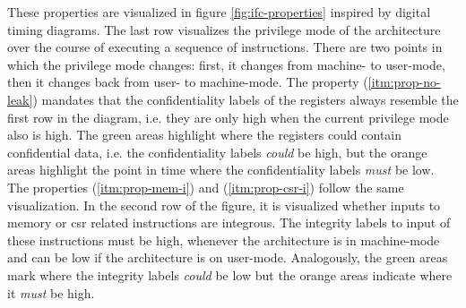These properties are visualized in figure \ref{fig:ifc-properties} inspired by digital timing diagrams.
The last row visualizes the privilege mode of the architecture over the course of executing a sequence of instructions.
There are two points in which the privilege mode changes: first, it changes from machine- to user-mode, then it changes back from user- to machine-mode.
The  property (\ref{itm:prop-no-leak}) mandates that the confidentiality labels of the registers always resemble the first row in the diagram, i.e. they are only high when the current privilege mode also is high.
The green areas highlight where the registers could contain confidential data, i.e. the confidentiality  labels \textit{could} be high, but the orange areas highlight the point in time where the confidentiality labels \textit{must} be low.
The properties  (\ref{itm:prop-mem-i}) and  (\ref{itm:prop-csr-i}) follow the same visualization.
In the second row of the figure, it is visualized whether inputs to memory or \gls{csr} related instructions are integrous.
The integrity labels to input of these instructions must be high, whenever the architecture is in machine-mode and can be low if the architecture is on user-mode.
Analogously, the green areas mark where the integrity labels \textit{could} be low but the orange areas indicate where it \textit{must} be high.
